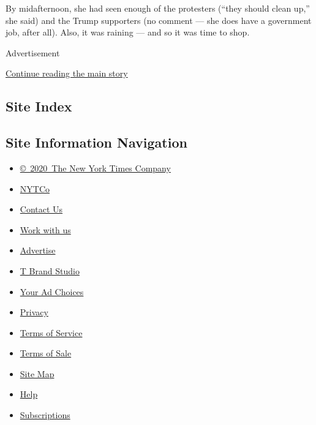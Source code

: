 By midafternoon, she had seen enough of the protesters (``they should
clean up,'' she said) and the Trump supporters (no comment --- she does
have a government job, after all). Also, it was raining --- and so it
was time to shop.

Advertisement

\protect\hyperlink{after-bottom}{Continue reading the main story}

\hypertarget{site-index}{%
\subsection{Site Index}\label{site-index}}

\hypertarget{site-information-navigation}{%
\subsection{Site Information
Navigation}\label{site-information-navigation}}

\begin{itemize}
\tightlist
\item
  \href{https://help.nytimes.com/hc/en-us/articles/115014792127-Copyright-notice}{©~2020~The
  New York Times Company}
\end{itemize}

\begin{itemize}
\tightlist
\item
  \href{https://www.nytco.com/}{NYTCo}
\item
  \href{https://help.nytimes.com/hc/en-us/articles/115015385887-Contact-Us}{Contact
  Us}
\item
  \href{https://www.nytco.com/careers/}{Work with us}
\item
  \href{https://nytmediakit.com/}{Advertise}
\item
  \href{http://www.tbrandstudio.com/}{T Brand Studio}
\item
  \href{https://www.nytimes.com/privacy/cookie-policy\#how-do-i-manage-trackers}{Your
  Ad Choices}
\item
  \href{https://www.nytimes.com/privacy}{Privacy}
\item
  \href{https://help.nytimes.com/hc/en-us/articles/115014893428-Terms-of-service}{Terms
  of Service}
\item
  \href{https://help.nytimes.com/hc/en-us/articles/115014893968-Terms-of-sale}{Terms
  of Sale}
\item
  \href{https://spiderbites.nytimes.com}{Site Map}
\item
  \href{https://help.nytimes.com/hc/en-us}{Help}
\item
  \href{https://www.nytimes.com/subscription?campaignId=37WXW}{Subscriptions}
\end{itemize}
